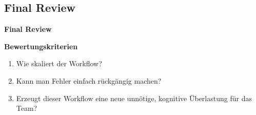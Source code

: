 \begin{frame}[c]
    \slidehead
    \centering
    \Large
\end{frame}

\subsection{Final Review}\label{subsec:final-review}
\begin{frame}[c]
    \slidehead
    \centering
    \Large
    \textbf{Final Review}
\end{frame}

\begin{frame}[c]
    \slidehead
    \large
    \textbf{Bewertungskriterien}
    \normalsize
    \begin{enumerate}
        \item<2-> Wie skaliert der Workflow? 
        \item<4-> Kann man Fehler einfach rückgängig machen? 
        \item<6-> Erzeugt dieser Workflow eine neue unnötige, kognitive Überlastung für das Team? 
    \end{enumerate}
\end{frame}
